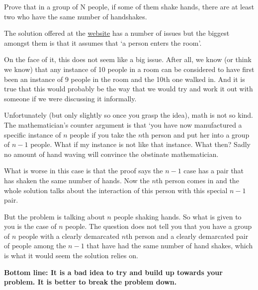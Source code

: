 \documentclass[12pt]{article}
\begin{document}
\begin{Exercise*}
Prove that in a group of N people,
if some of them shake hands,
there are at least two who have the same number of handshakes. 
\end{Exercise*}

The solution offered at the \href{http://www.gottfriedville.net/mathprob/comb-shakes.html}{website} has a number of issues but the biggest amongst them is that it assumes that `a person enters the room'. 

On the face of it, this does not seem like a big issue. After all, we know (or think we know) that any instance of 10 people in a room can be considered to have first been an instance of 9 people in the room and the 10th one walked in. And it is true that this would probably be the way that we would try and work it out with someone if we were discussing it informally.

Unfortunately (but only slightly so once you grasp the idea), math is not so kind. The mathematician's counter argument is that `you have now manufactured a specific instance of $n$ people if you take the $n$th person and put her into a group of $n-1$ people. What if my instance is not like that instance. What then? Sadly no amount of hand waving will convince the obstinate mathematician. 

What is worse in this case is that the proof says the $n-1$ case has a pair that has shaken the same number of hands. Now the $n$th person comes in and the whole solution talks about the interaction of this person with this special $n-1$ pair. 

But the problem is talking about $n$ people shaking hands. So what is given to you is the case of $n$ people. The question does not tell you that you have a group of $n$ people with a clearly demarcated $n$th person and a clearly demarcated pair of people among the $n-1$ that have had the same number of hand shakes, which is what it would seem the solution relies on.

\textbf {Bottom line: It is a bad idea to try and build up towards your problem. It is better to break the problem down.}
\end{document}
